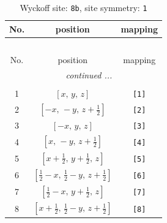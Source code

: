 \documentclass[fleqn,8pt]{jsarticle}
\begin{document}
\begin{longtable}{ccc}
\caption{Wyckoff site: {\tt 8b}, site symmetry: {\tt 1}}
 \\
 \hline \hline
No. & position & mapping \\ \hline \endfirsthead

\multicolumn{2}{l}{\tablename\ \thetable{}} \\
 \hline \hline
No. & position & mapping \\ \hline \endhead

 \hline \hline
\multicolumn{2}{r}{\footnotesize\it continued ...} \\ \endfoot

 \hline \hline
\multicolumn{2}{r}{} \\ \endlastfoot

1 & $\left[ x,\, y,\, z \right]$ & {\tt [1]} \\ \hline
2 & $\left[ - x,\, - y,\, z + \frac{1}{2} \right]$ & {\tt [2]} \\ \hline
3 & $\left[ - x,\, y,\, z \right]$ & {\tt [3]} \\ \hline
4 & $\left[ x,\, - y,\, z + \frac{1}{2} \right]$ & {\tt [4]} \\ \hline
5 & $\left[ x + \frac{1}{2},\, y + \frac{1}{2},\, z \right]$ & {\tt [5]} \\ \hline
6 & $\left[ \frac{1}{2} - x,\, \frac{1}{2} - y,\, z + \frac{1}{2} \right]$ & {\tt [6]} \\ \hline
7 & $\left[ \frac{1}{2} - x,\, y + \frac{1}{2},\, z \right]$ & {\tt [7]} \\ \hline
8 & $\left[ x + \frac{1}{2},\, \frac{1}{2} - y,\, z + \frac{1}{2} \right]$ & {\tt [8]} \\
\end{longtable}
\end{document}
